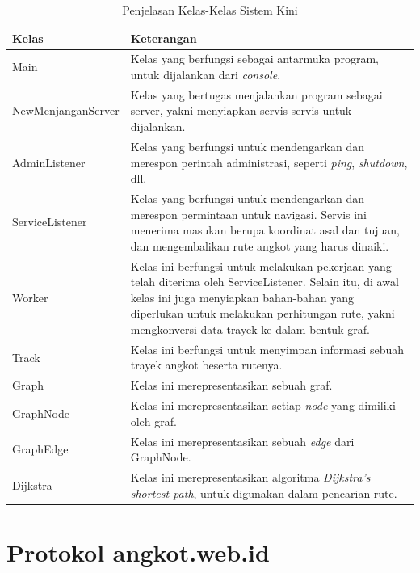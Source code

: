\begin{table}
	\caption{Penjelasan Kelas-Kelas Sistem Kini}
	\label{tab:2_penjelasan_kelas_kelas_sistem_kini}
	\begin{tabular}{|p{4cm}|p{11cm}|}
		\hline
		Kelas & Keterangan \\
		\hline
		Main & Kelas yang berfungsi sebagai antarmuka program, untuk dijalankan
			dari \textit{console}. \\
		NewMenjanganServer & Kelas yang bertugas menjalankan program sebagai
			server, yakni menyiapkan servis-servis untuk dijalankan. \\
		AdminListener & Kelas yang berfungsi untuk mendengarkan dan merespon
			perintah administrasi, seperti \textit{ping}, \textit{shutdown},
			dll. \\
		ServiceListener & Kelas yang berfungsi untuk mendengarkan dan merespon
			permintaan untuk navigasi. Servis ini menerima masukan berupa
			koordinat asal dan tujuan, dan mengembalikan rute angkot yang harus
			dinaiki. \\
		Worker & Kelas ini berfungsi untuk melakukan pekerjaan yang telah
			diterima oleh ServiceListener. Selain itu, di awal kelas ini juga
			menyiapkan bahan-bahan yang diperlukan untuk melakukan perhitungan
			rute, yakni mengkonversi data trayek ke dalam bentuk graf. \\
		Track & Kelas ini berfungsi untuk menyimpan informasi sebuah trayek
			angkot beserta rutenya. \\
		Graph & Kelas ini merepresentasikan sebuah graf. \\
		GraphNode & Kelas ini merepresentasikan setiap \textit{node} yang
			dimiliki oleh graf. \\
		GraphEdge & Kelas ini merepresentasikan sebuah \textit{edge} dari
			GraphNode. \\
		Dijkstra & Kelas ini merepresentasikan algoritma \textit{Dijkstra's
			shortest path}\cite{Cormen:2001}, untuk digunakan dalam pencarian rute. \\
		\hline
	\end{tabular}
\end{table}

\section{Protokol angkot.web.id}
\label{sec:mesin_navigasi_kiri}